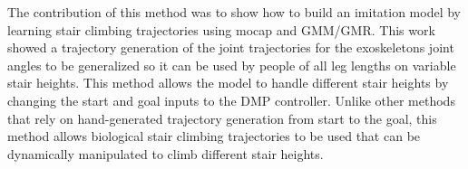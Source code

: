 The contribution of this method was to show how to build an imitation model by learning stair climbing trajectories using mocap and GMM/GMR. This work showed a trajectory generation of the joint trajectories for the exoskeletons joint angles to be generalized so it can be used by people of all leg lengths on variable stair heights. This method allows the model to handle different stair heights by changing the start and goal inputs to the DMP controller. Unlike other methods that rely on hand-generated trajectory generation from start to the goal, this method allows biological stair climbing trajectories to be used that can be dynamically manipulated to climb different stair heights.


